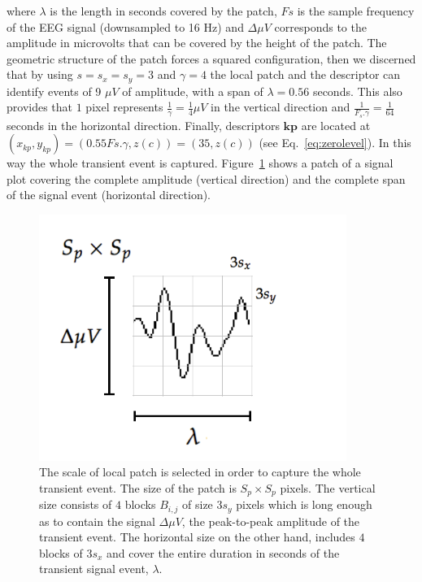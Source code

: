 \documentclass[entropy,article,submit,moreauthors,pdftex,10pt,a4paper]{mdpi}
\begin{document}
\noindent where $ \lambda $ is the length in seconds covered by the patch, $ Fs $ is the sample frequency of the EEG signal (downsampled to 16 Hz) and  $\Delta  \mu V $ corresponds to the amplitude in microvolts that can be covered by the height of the patch. The geometric structure of the patch forces a squared configuration, then we discerned that by using $ s =s_x =s_y = 3 $ and $ \gamma = 4 $  the local patch and the descriptor can identify events of 9 $ \mu V $ of amplitude, with a span of $ \lambda = 0.56$ seconds.  This also provides that $ 1 $ pixel represents $ \frac{1}{\gamma}= \frac{1}{4} \mu V $ in the vertical direction and $\frac{1}{F_s.\gamma}=\frac{1}{64}$ seconds in the horizontal direction. Finally, descriptors  $\mathbf{kp}$  are located at $ (x_{kp}, y_{kp} )= ( 0.55 Fs.\gamma, z(c) )= (35,  z(c)) $ (see Eq.~\ref{eq:zerolevel}).   In this way the whole transient event is captured. 
Figure~\ref{fig:sampledescriptor2} shows a patch of a signal plot covering the complete amplitude (vertical direction) and the complete span of the signal event (horizontal direction). 

\begin{figure}[H]
\centering
\includegraphics[width=10cm]{patchgeometry.pdf}
\caption{The scale of local patch is selected in order to capture the whole transient event.  The size of the patch is $S_p \times S_p$ pixels. The vertical size consists of $4$ blocks $B_{i,j}$  of size $3 s_y$ pixels which is long enough as to contain the signal $\Delta  \mu V $, the peak-to-peak amplitude of the transient event. The horizontal size on the other hand, includes $4$ blocks  of $3 s_x$ and cover the entire duration in seconds of the transient signal event, $ \lambda $.   }

\label{fig:sampledescriptor2}
\end{figure}
\end{document}

